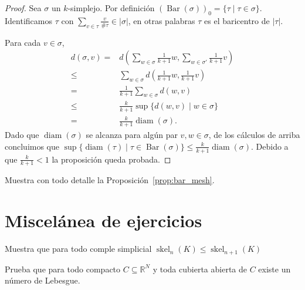 \documentclass{standalone}
\begin{document}
	\begin{proof}
		Sea $\sigma$ un $k$-simplejo. Por definición $(\operatorname{Bar}(\sigma))_{0}=\{\tau\mid\tau\in \sigma\}$. Identificamos $\tau$ con $\sum_{v\in\tau}\frac{v}{\#\tau}\in|\sigma|$, en otras palabras $\tau$ es el baricentro de $|\tau|$.
		
		Para cada $v\in \sigma$, \begin{align}
			d(\sigma,v)=&d(\sum_{w\in\sigma}\frac{1}{k+1}w,\sum_{w\in\sigma'}\frac{1}{k+1}v)\\
			\leq& \sum_{w\in\sigma}d(\frac{1}{k+1}w,\frac{1}{k+1}v)\\
			=&\frac{1}{k+1}\sum_{w\in\sigma}d(w,v)\\
			\leq&\frac{k}{k+1}\sup\{d(w,v)\mid w\in\sigma\}\\
			=&\frac{k}{k+1}\operatorname{diam}(\sigma).		
		\end{align}
		Dado que $\operatorname{diam}(\sigma)$ se alcanza para algún par $v,w\in\sigma$, de los cálculos de arriba concluimos que $\sup\{\operatorname{diam}(\tau)\mid\tau\in\operatorname{Bar}(\sigma)\}\leq\frac{k}{k+1}\operatorname{diam}(\sigma)$. Debido a que $\frac{k}{k+1}<1$ la proposición queda probada.
	\end{proof}
	\begin{exercise}
		Muestra con todo detalle la Proposición~\ref{prop:bar_mesh}.
	\end{exercise}
	
	\section*{Miscelánea de ejercicios}
	
	\begin{exercise}
		Muestra que para todo comple simplicial $\operatorname{skel}_{n}(K)\leq\operatorname{skel}_{n+1}(K)$
	\end{exercise}
	
	\begin{exercise}
		Prueba que para todo compacto $C\subseteq \mathbb{R}^{N}$ y toda cubierta abierta de $C$ existe un número de Lebesgue.
	\end{exercise}
\end{document}
